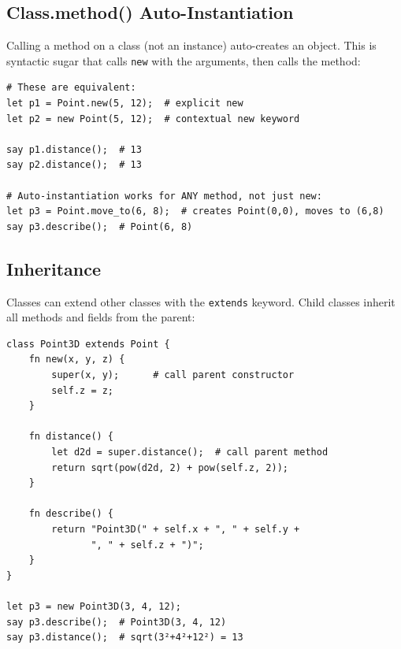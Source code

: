 \subsection{Class.method() Auto-Instantiation}

Calling a method on a class (not an instance) auto-creates an object. This is syntactic sugar that calls \texttt{new} with the arguments, then calls the method:

\begin{tcolorbox}[colback=codebg, colframe=darkpurple, colbacktitle=darkpurple, title=\textbf{\textcolor{codegold}{Auto-Instantiation}}, fonttitle=\bfseries, sharp corners]
\begin{lstlisting}
# These are equivalent:
let p1 = Point.new(5, 12);  # explicit new
let p2 = new Point(5, 12);  # contextual new keyword

say p1.distance();  # 13
say p2.distance();  # 13

# Auto-instantiation works for ANY method, not just new:
let p3 = Point.move_to(6, 8);  # creates Point(0,0), moves to (6,8)
say p3.describe();  # Point(6, 8)
\end{lstlisting}
\end{tcolorbox}

\subsection{Inheritance}

Classes can extend other classes with the \texttt{extends} keyword. Child classes inherit all methods and fields from the parent:

\begin{tcolorbox}[colback=codebg, colframe=darkpurple, colbacktitle=darkpurple, title=\textbf{\textcolor{codegold}{Inheritance}}, fonttitle=\bfseries, sharp corners]
\begin{lstlisting}
class Point3D extends Point {
    fn new(x, y, z) {
        super(x, y);      # call parent constructor
        self.z = z;
    }

    fn distance() {
        let d2d = super.distance();  # call parent method
        return sqrt(pow(d2d, 2) + pow(self.z, 2));
    }

    fn describe() {
        return "Point3D(" + self.x + ", " + self.y +
               ", " + self.z + ")";
    }
}

let p3 = new Point3D(3, 4, 12);
say p3.describe();  # Point3D(3, 4, 12)
say p3.distance();  # sqrt(3²+4²+12²) = 13
\end{lstlisting}
\end{tcolorbox}

